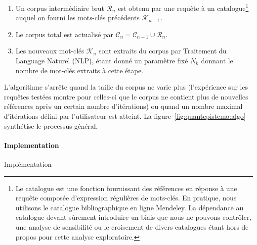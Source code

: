 {\begin{enumerate}
\item Un corpus intermédiaire brut $\mathcal{R}_n$ est obtenu par une requête à un catalogue\footnote{Le catalogue est une fonction fournissant des références en réponse à une requête composée d'expression régulières de mots-clés. En pratique, nous utilisons le catalogue bibliographique en ligne Mendeley. La dépendance au catalogue devant sûrement introduire un biais que nous ne pouvons contrôler, une analyse de sensibilité ou le croisement de divers catalogues étant hors de propos pour cette analyse exploratoire.}
 auquel on fourni les mots-clés précédents $\mathcal{K}_{n-1}$.
\item Le corpus total est actualisé par $\mathcal{C}_n = \mathcal{C}_{n-1} \cup \mathcal{R}_n$.
\item Les nouveaux mot-clés $\mathcal{K}_n$ sont extraits du corpus par Traitement du Language Naturel (NLP), étant donné un paramètre fixé $N_k$ donnant le nombre de mot-clés extraits à cette étape.
\end{enumerate}

L'algorithme s'arrête quand la taille du corpus ne varie plus (l'expérience sur les requêtes testées montre pour celles-ci que le corpus ne contient plus de nouvelles références après un certain nombre d'itérations) ou quand un nombre maximal d'itérations défini par l'utilisateur est atteint. La figure~\ref{fig:quantepistemo:algo} synthétise le processus général.
}




\paragraph{Implementation}{Implémentation}


